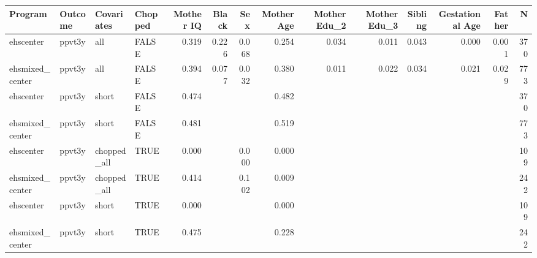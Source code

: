 \begin{table}[ht]
\centering
\begin{tabular}{llllrrrrrrrrrr}
  \hline
Program & Outcome & Covariates & Chopped & Mother IQ & Black & Sex & Mother Age & Mother Edu\_2 & Mother Edu\_3 & Sibling & Gestational Age & Father & N \\ 
  \hline
ehscenter & ppvt3y & all & FALSE & 0.319 & 0.226 & 0.068 & 0.254 & 0.034 & 0.011 & 0.043 & 0.000 & 0.001 & 370 \\ 
  ehsmixed\_center & ppvt3y & all & FALSE & 0.394 & 0.077 & 0.032 & 0.380 & 0.011 & 0.022 & 0.034 & 0.021 & 0.029 & 773 \\ 
  ehscenter & ppvt3y & short & FALSE & 0.474 &  &  & 0.482 &  &  &  &  &  & 370 \\ 
  ehsmixed\_center & ppvt3y & short & FALSE & 0.481 &  &  & 0.519 &  &  &  &  &  & 773 \\ 
  ehscenter & ppvt3y & chopped\_all & TRUE & 0.000 &  & 0.000 & 0.000 &  &  &  &  &  & 109 \\ 
  ehsmixed\_center & ppvt3y & chopped\_all & TRUE & 0.414 &  & 0.102 & 0.009 &  &  &  &  &  & 242 \\ 
  ehscenter & ppvt3y & short & TRUE & 0.000 &  &  & 0.000 &  &  &  &  &  & 109 \\ 
  ehsmixed\_center & ppvt3y & short & TRUE & 0.475 &  &  & 0.228 &  &  &  &  &  & 242 \\ 
   \hline
\end{tabular}
\end{table}
